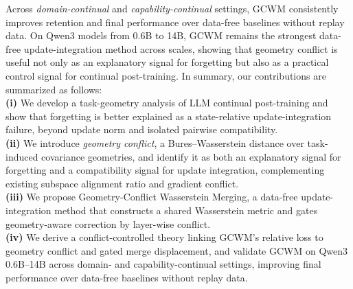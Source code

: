 \documentclass{article}
\begin{document}
\vspace{-0.1em}
Across \emph{domain-continual} and \emph{capability-continual} settings, GCWM consistently improves retention and final performance over data-free baselines without replay data. On Qwen3 models from 0.6B to 14B, GCWM remains the strongest data-free update-integration method across scales, showing that geometry conflict is useful not only as an explanatory signal for forgetting but also as a practical control signal for continual post-training.
In summary, our contributions are summarized as follows:
\vspace{0.4em}
\\
\textbf{(i)} We develop a task-geometry analysis of LLM continual post-training and show that forgetting is better explained as a state-relative update-integration failure, beyond update norm and isolated pairwise compatibility.
\\
\textbf{(ii)} We introduce \emph{geometry conflict}, a Bures--Wasserstein distance over task-induced covariance geometries, and identify it as both an explanatory signal for forgetting and a compatibility signal for update integration, complementing existing subspace alignment ratio and gradient conflict.
\\
\textbf{(iii)} We propose Geometry-Conflict Wasserstein Merging, a data-free update-integration method that constructs a shared Wasserstein metric and gates geometry-aware correction by layer-wise conflict.
\\
\textbf{(iv)} We derive a conflict-controlled theory linking GCWM's relative loss to geometry conflict and gated merge displacement, and validate GCWM on Qwen3 0.6B--14B across domain- and capability-continual settings, improving final performance over data-free baselines without replay data.
\end{document}
